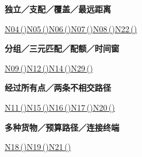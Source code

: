 \documentclass[10pt,a4paper]{article}
\begin{document}
\begin{minipage}{\linewidth}\textbf{独立／支配／覆盖／最远距离}\par{\fontsize{9.5}{12}\selectfont \hyperref[N04]{N04\,(\pageref*{N04})}\hspace{.5em}\allowbreak \hyperref[N05]{N05\,(\pageref*{N05})}\hspace{.5em}\allowbreak \hyperref[N06]{N06\,(\pageref*{N06})}\hspace{.5em}\allowbreak \hyperref[N07]{N07\,(\pageref*{N07})}\hspace{.5em}\allowbreak \hyperref[N08]{N08\,(\pageref*{N08})}\hspace{.5em}\allowbreak \hyperref[N22]{N22\,(\pageref*{N22})}}\end{minipage}\par\vspace{5pt}
\begin{minipage}{\linewidth}\textbf{分组／三元匹配／配额／时间窗}\par{\fontsize{9.5}{12}\selectfont \hyperref[N09]{N09\,(\pageref*{N09})}\hspace{.5em}\allowbreak \hyperref[N12]{N12\,(\pageref*{N12})}\hspace{.5em}\allowbreak \hyperref[N14]{N14\,(\pageref*{N14})}\hspace{.5em}\allowbreak \hyperref[N29]{N29\,(\pageref*{N29})}}\end{minipage}\par\vspace{5pt}
\begin{minipage}{\linewidth}\textbf{经过所有点／两条不相交路径}\par{\fontsize{9.5}{12}\selectfont \hyperref[N11]{N11\,(\pageref*{N11})}\hspace{.5em}\allowbreak \hyperref[N15]{N15\,(\pageref*{N15})}\hspace{.5em}\allowbreak \hyperref[N16]{N16\,(\pageref*{N16})}\hspace{.5em}\allowbreak \hyperref[N17]{N17\,(\pageref*{N17})}\hspace{.5em}\allowbreak \hyperref[N20]{N20\,(\pageref*{N20})}}\end{minipage}\par\vspace{5pt}
\begin{minipage}{\linewidth}\textbf{多种货物／预算路径／连接终端}\par{\fontsize{9.5}{12}\selectfont \hyperref[N18]{N18\,(\pageref*{N18})}\hspace{.5em}\allowbreak \hyperref[N19]{N19\,(\pageref*{N19})}\hspace{.5em}\allowbreak \hyperref[N21]{N21\,(\pageref*{N21})}}\end{minipage}\par\vspace{5pt}
\end{document}
